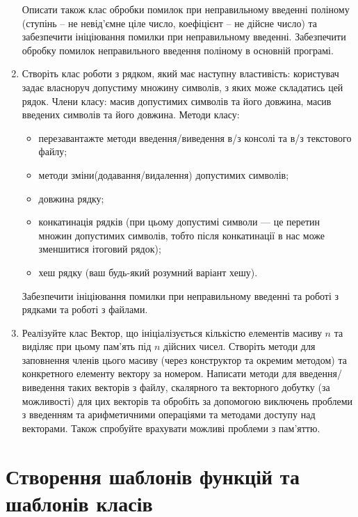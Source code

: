 \documentclass[a5paper,titlepage,openany,twoside,draft]{book_unv}%
\begin{document}
\begin{enumerate}
Описати також клас обробки помилок при неправильному введенні поліному
(ступінь -- не невід'ємне ціле число, коефіцієнт -- не дійсне число) та
забезпечити ініціювання помилки при неправильному введенні.
Забезпечити обробку помилок неправильного введення поліному в основній програмі.

\item
Створіть клас роботи з рядком, який має наступну властивість: 
користувач задає власноруч допустиму множину символів, з яких може складатись цей рядок.
Члени класу: масив допустимих символів та його довжина,
масив введених символів та його довжина.
Методи класу:
\begin{itemize}
\item
перезавантажте методи введення/виведення в/з консолі та в/з текстового файлу;
\item
методи зміни(додавання/видалення) допустимих символів;
\item
довжина рядку;
\item
конкатинація рядків (при цьому допустимі символи --- це перетин 
множин допустимих символів, 
тобто після конкатинації в нас може зменшитися ітоговий рядок);
\item
хеш рядку (ваш будь-який розумний варіант хешу).
\end{itemize}
Забезпечити ініціювання помилки при неправильному введенні та роботі з рядками 
та роботі з файлами.

\item

Реалізуйте клас Вектор, що ініціалізується кількістю елементів масиву $n$
  та виділяє при цьому пам'ять під $n$ дійсних чисел. Створіть методи для
  заповнення членів цього масиву (через конструктор та окремим методом)
  та конкретного елементу вектору за номером. 
  Написати методи для введення/виведення таких векторів з файлу,
  скалярного та векторного добутку (за можливості) для цих векторів та обробіть
  за допомогою виключень проблеми з введенням та арифметичними операціями та методами 
 доступу над векторами. Також спробуйте врахувати можливі проблеми з пам'яттю.
 
\end{enumerate}


\chapter{Створення шаблонів функцій та шаблонів класів}
%
\end{document}
